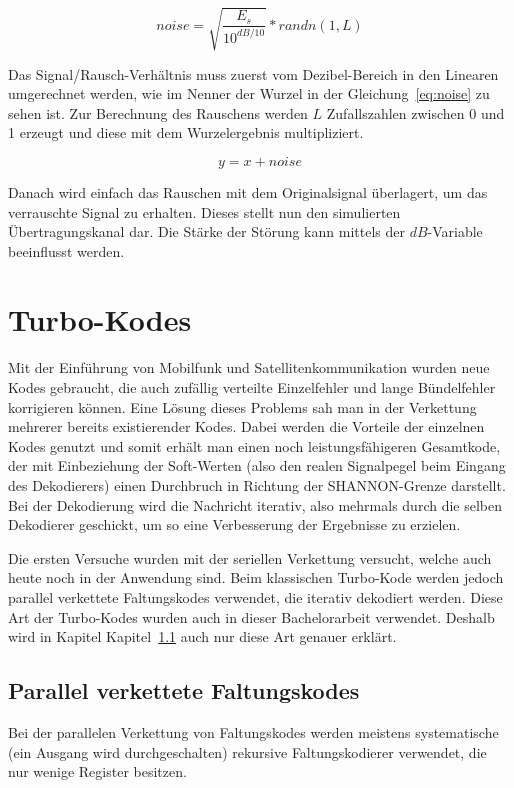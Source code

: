 \begin{equation}
noise = \sqrt{\frac{E_s}{10^{dB/10}}} * randn(1,L)
\label{eq:noise}
\end{equation}

Das Signal/Rausch-Verhältnis muss zuerst vom Dezibel-Bereich in den Linearen umgerechnet werden, wie im Nenner der Wurzel in der Gleichung~\ref{eq:noise} zu sehen ist.
Zur Berechnung des Rauschens werden $L$ Zufallszahlen zwischen 0 und 1 erzeugt und diese mit dem Wurzelergebnis multipliziert. 

\begin{equation}
y = x + noise
\label{eq:noisySignal}
\end{equation}

Danach wird einfach das Rauschen mit dem Originalsignal überlagert, um das verrauschte Signal zu erhalten. Dieses stellt nun den simulierten Übertragungskanal dar. Die Stärke der Störung kann mittels der $dB$-Variable beeinflusst werden.~\cite{AWGN}

\section{Turbo-Kodes}
\label{sec:turboCodes}
Mit der Einführung von Mobilfunk und Satellitenkommunikation wurden neue Kodes gebraucht, die auch zufällig verteilte Einzelfehler und lange Bündelfehler korrigieren können. Eine Lösung dieses Problems sah man in der Verkettung mehrerer bereits existierender Kodes. Dabei werden die Vorteile der einzelnen Kodes genutzt und somit erhält man einen noch leistungsfähigeren Gesamtkode, der mit Einbeziehung der Soft-Werten (also den realen Signalpegel beim Eingang des Dekodierers) einen Durchbruch in Richtung der SHANNON-Grenze darstellt. Bei der Dekodierung wird die Nachricht iterativ, also mehrmals durch die selben Dekodierer geschickt, um so eine Verbesserung der Ergebnisse zu erzielen.~\cite[S.~242~f.]{schoenfeld2012informations}

Die ersten Versuche wurden mit der seriellen Verkettung versucht, welche auch heute noch in der Anwendung sind. Beim klassischen Turbo-Kode werden jedoch parallel verkettete Faltungskodes verwendet, die iterativ dekodiert werden. Diese Art der Turbo-Kodes wurden auch in dieser Bachelorarbeit verwendet. Deshalb wird in Kapitel Kapitel~\ref{sec:parallelConvCodes} auch nur diese Art genauer erklärt.

\subsection{Parallel verkettete Faltungskodes} 
\label{sec:parallelConvCodes}
Bei der parallelen Verkettung von Faltungskodes werden meistens systematische (ein Ausgang wird durchgeschalten) rekursive Faltungskodierer verwendet, die nur wenige Register besitzen.

